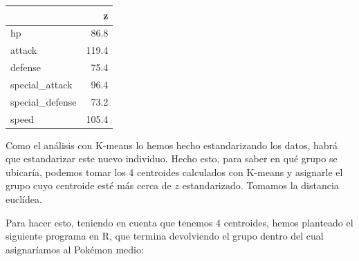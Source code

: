 \documentclass[
  11.8pt,
]{extreport}
\begin{document}
\begin{table}[H]
\centering\begingroup\fontsize{11.5}{13.5}\selectfont

\begin{tabular}{lr}
\toprule
  & z\\
\midrule
hp & 86.8\\
attack & 119.4\\
defense & 75.4\\
special\_attack & 96.4\\
special\_defense & 73.2\\
\addlinespace
speed & 105.4\\
\bottomrule
\end{tabular}
\endgroup{}
\end{table}

Como el análisis con K-means lo hemos hecho estandarizando los datos,
habrá que estandarizar este nuevo individuo. Hecho esto, para saber en
qué grupo se ubicaría, podemos tomar los 4 centroides calculados con
K-means y asignarle el grupo cuyo centroide esté más cerca de \(z\)
estandarizado. Tomamos la distancia euclídea.

Para hacer esto, teniendo en cuenta que tenemos 4 centroides, hemos
planteado el siguiente programa en R, que termina devolviendo el grupo
dentro del cual asignaríamos al Pokémon medio:

\vspace{1cm}
\end{document}
